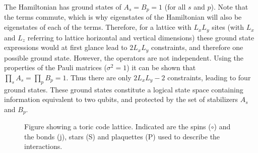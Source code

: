 The Hamiltonian has ground states of $A_s=B_p=1$ (for all $s$ and $p$). Note that the terms commute, which is why eigenstates of the Hamiltonian will also be eigenstates of each of the terms. Therefore, for a lattice with $L_xL_y$ sites (with $L_x$ and $L_z$ referring to lattice horizontal and vertical dimensions) these ground state expressions would at first glance lead to $2L_xL_y$ constraints, and therefore one possible ground state. However, the operators are not independent. Using the properties of the Pauli matrices ($\sigma^2=1$) it can be shown that $\prod_{s}A_s=\prod_{p}B_p=1$. Thus there are only $2L_xL_y-2$ constraints, leading to four ground states. These ground states constitute a logical state space containing information equivalent to two qubits, and protected by the set of stabilizers $A_s$ and $B_p$.

\begin{figure}
    \centering

    \caption[Figure showing a toric code lattice]{Figure showing a toric code lattice. Indicated are the spins (\textcolor{NavyBlue}{$\circ$}) and the bonds (j), stars (S) and plaquettes (P) used to describe the interactions.}
    \label{fig:toric_code}
\end{figure}

